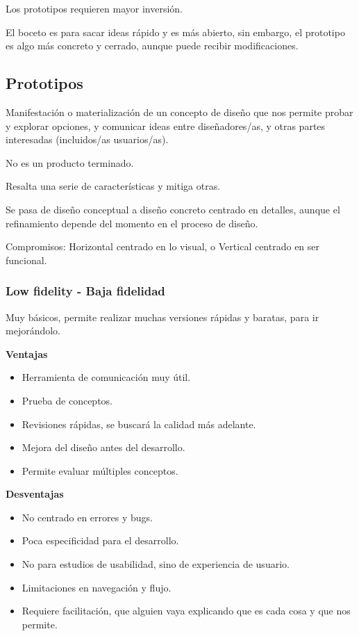 \documentclass[12pt, twoside, openright]{report} %
\begin{document}
Los prototipos requieren mayor inversión.

El boceto es para sacar ideas rápido y es más abierto, sin embargo, el prototipo es algo más concreto y cerrado, aunque puede recibir modificaciones.

\subsection{Prototipos}
Manifestación o materialización de un concepto de diseño que nos permite probar y explorar opciones, y comunicar ideas entre diseñadores/as, y otras partes interesadas (incluidos/as usuarios/as).

No es un producto terminado.

Resalta una serie de características y mitiga otras.

Se pasa de diseño conceptual a diseño concreto centrado en detalles, aunque el refinamiento depende del momento en el proceso de diseño.

Compromisos: Horizontal centrado en lo visual, o Vertical centrado en ser funcional.
\subsubsection{Low fidelity - Baja fidelidad}
Muy básicos, permite realizar muchas versiones rápidas y baratas, para ir mejorándolo.

\textbf{Ventajas}
\begin{itemize}
	\item Herramienta de comunicación muy útil.
	\item Prueba de conceptos.
	\item Revisiones rápidas, se buscará la calidad más adelante.
	\item Mejora del diseño antes del desarrollo.
	\item Permite evaluar múltiples conceptos.
\end{itemize}

\textbf{Desventajas}
\begin{itemize}
	\item No centrado en errores y bugs.
	\item Poca especificidad para el desarrollo.
	\item No para estudios de usabilidad, sino de experiencia de usuario.
	\item Limitaciones en navegación y flujo.
	\item Requiere facilitación, que alguien vaya explicando que es cada cosa y que nos permite.
\end{itemize}
\end{document}
